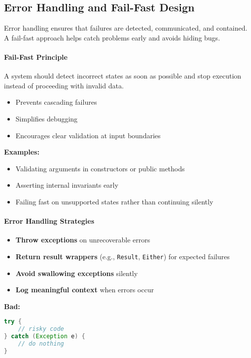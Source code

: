 \documentclass[a4paper,12pt]{article}
\begin{document}
\subsection{Error Handling and Fail-Fast Design}

Error handling ensures that failures are detected, communicated, and contained. A fail-fast approach helps catch problems early and avoids hiding bugs.

\paragraph{Fail-Fast Principle}
A system should detect incorrect states as soon as possible and stop execution instead of proceeding with invalid data.

\begin{itemize}
  \item Prevents cascading failures
  \item Simplifies debugging
  \item Encourages clear validation at input boundaries
\end{itemize}

\textbf{Examples:}
\begin{itemize}
  \item Validating arguments in constructors or public methods
  \item Asserting internal invariants early
  \item Failing fast on unsupported states rather than continuing silently
\end{itemize}

\paragraph{Error Handling Strategies}

\begin{itemize}
  \item \textbf{Throw exceptions} on unrecoverable errors
  \item \textbf{Return result wrappers} (e.g., \texttt{Result}, \texttt{Either}) for expected failures
  \item \textbf{Avoid swallowing exceptions} silently
  \item \textbf{Log meaningful context} when errors occur
\end{itemize}

\textbf{Bad:}
\begin{lstlisting}[language=Java]
try {
    // risky code
} catch (Exception e) {
    // do nothing
}
\end{lstlisting}
\end{document}
